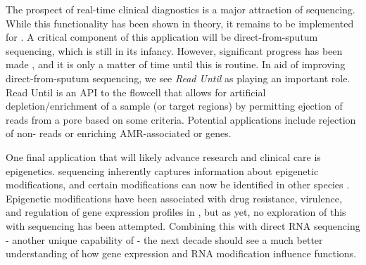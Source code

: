 The prospect of real-time clinical diagnostics is a major attraction of \ont{} sequencing. While this functionality has been shown in theory, it remains to be implemented for \mtb{}. A critical component of this application will be direct-from-sputum \ont{} sequencing, which is still in its infancy. However, significant progress has been made \cite{George2020,Votintseva2017}, and it is only a matter of time until this is routine. In aid of improving direct-from-sputum sequencing, we see \emph{Read Until} \cite{Payne2021,Kovaka2021} as playing an important role. Read Until is an API to the flowcell that allows for artificial depletion/enrichment of a sample (or target regions) by permitting ejection of reads from a pore based on some criteria. Potential applications include rejection of non-\mtb{} reads or enriching AMR-associated or \ppe{} genes.

One final application that will likely advance \mtb{} research and clinical care is epigenetics. \ont{} sequencing inherently captures information about epigenetic modifications, and certain modifications can now be identified in other species \cite{Furlan2021}. Epigenetic modifications have been associated with drug resistance, virulence, and regulation of gene expression profiles in \mtb{} \cite{Phelan2018Methylation,Shell2013,Zhu2016Precision}, but as yet, no exploration of this with \ont{} sequencing has been attempted. Combining this with direct RNA sequencing - another unique capability of \ont{} - the next decade should see a much better understanding of how gene expression and RNA modification influence \mtb{} functions.
